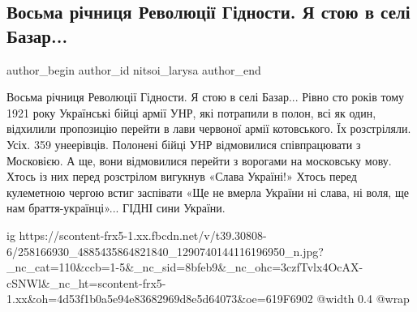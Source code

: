  
 
 
 
 
 
\subsection{Восьма річниця Революції Гідности. Я стою в селі Базар...}
\label{sec:21_11_2021.fb.nitsoi_larysa.1.revgidnosti_selo_bazar}
 
\ifcmt
 author_begin
   author_id nitsoi_larysa
 author_end
\fi

Восьма річниця Революції Гідности. Я стою в селі Базар... Рівно сто років тому
1921 року Українські бійці армії УНР, які потрапили в полон, всі як один,
відхилили пропозицію перейти в лави червоної армії котовського. Їх розстріляли.
Усіх. 359  унеерівців. Полонені бійці УНР відмовилися співпрацювати з
Московією. А ще, вони відмовилися перейти з ворогами на московську мову. Хтось
із них перед розстрілом вигукнув «Слава Україні!» Хтось перед кулеметною чергою
встиг заспівати «Ще не вмерла України ні слава, ні воля, ще нам
браття-українці»...  ГІДНІ сини України.

\ifcmt
  ig https://scontent-frx5-1.xx.fbcdn.net/v/t39.30808-6/258166930_4885435864821840_1290740144116196950_n.jpg?_nc_cat=110&ccb=1-5&_nc_sid=8bfeb9&_nc_ohc=3czfTvlx4OcAX-cSNWl&_nc_ht=scontent-frx5-1.xx&oh=4d53f1b0a5e94e83682969d8e5d64073&oe=619F6902
  @width 0.4
  @wrap 
\fi


